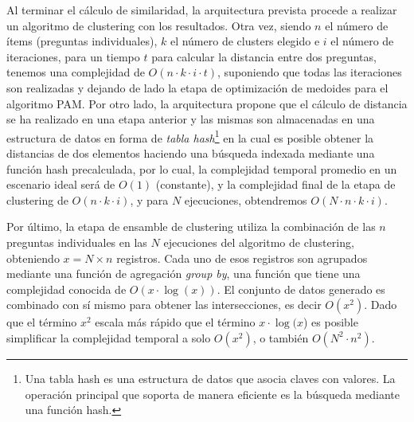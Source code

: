 \bigskip Al terminar el cálculo de similaridad, la arquitectura prevista procede a realizar un algoritmo de clustering con los resultados. Otra vez, siendo \(n\) el número de ítems (preguntas individuales), \(k\) el número de clusters elegido e \(i\) el número de iteraciones, para un tiempo \(t\) para calcular la distancia entre dos preguntas, tenemos una complejidad de \(O(n \cdot k \cdot i \cdot t)\), suponiendo que todas las iteraciones son realizadas y dejando de lado la etapa de optimización de medoides para el algoritmo PAM. Por otro lado, la arquitectura propone que el cálculo de distancia se ha realizado en una etapa anterior y las mismas son almacenadas en una estructura de datos en forma de \textit{tabla hash}\footnote{Una tabla hash es una estructura de datos que asocia claves con valores. La operación principal que soporta de manera eficiente es la búsqueda mediante una función hash.} en la cual es posible obtener la distancias de dos elementos haciendo una búsqueda indexada mediante una función hash precalculada, por lo cual, la complejidad temporal promedio en un escenario ideal será de \(O(1)\) (constante), y la complejidad final de la etapa de clustering de \(O(n \cdot k \cdot i)\), y para \(N\) ejecuciones, obtendremos \(O(N \cdot n \cdot k \cdot i)\).

\bigskip Por último, la etapa de ensamble de clustering utiliza la combinación de las \(n\) preguntas individuales en las \(N\) ejecuciones del algoritmo de clustering, obteniendo \(x = N \times n\) registros. Cada uno de esos registros son agrupados mediante una función de agregación \textit{group by}, una función que tiene una complejidad conocida de  \(O(x \cdot \log(x))\). El conjunto de datos generado es combinado con sí mismo para obtener las intersecciones, es decir \(O(x^2)\). Dado que el término \(x^2\) escala más rápido que el término \(x \cdot \log(x\)) es posible simplificar la complejidad temporal a solo \(O(x^2)\), o también \(O(N^2 \cdot n^2)\).

